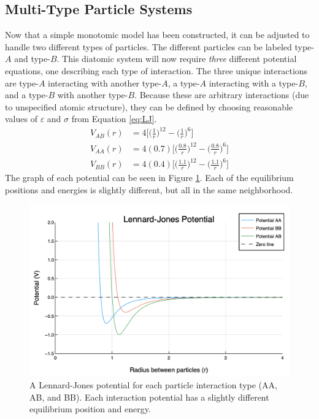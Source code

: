 \subsection{Multi-Type Particle Systems}\label{Sect:diatomic}
\par Now that a simple monotomic model has been constructed, it can be adjusted to handle two different types of particles. The different particles can be labeled type-$A$ and type-$B$. This diatomic system will now require \textit{three} different potential equations, one describing each type of interaction. The three unique interactions are type-$A$ interacting with another type-$A$, a type-$A$ interacting with a type-$B$, and a type-$B$ with another type-$B$. Because these are arbitrary interactions (due to unspecified atomic structure), they can be defined by choosing reasonable values of $\varepsilon$ and $\sigma$ from Equation \ref{eq:LJ}. 
\begin{align}
V_{AB}(r) &= 4 \bigg[\Big(\frac{1}{r}\Big)^{12} - \Big(\frac{1}{r}\Big)^6\bigg] \label{LJ} \\
V_{AA}(r) &= 4 (0.7) \bigg[\Big(\frac{0.8}{r}\Big)^{12} - \Big(\frac{0.8}{r}\Big)^6\bigg] \label{LJ} \\
V_{BB}(r) &= 4 (0.4) \bigg[\Big(\frac{1.1}{r}\Big)^{12} - \Big(\frac{1.1}{r}\Big)^6\bigg] \label{LJ}
\end{align}
The graph of each potential can be seen in Figure \ref{fig:3LJ}. Each of the equilibrium positions and energies is slightly different, but all in the same neighborhood.

\begin{figure}[h]
\includegraphics[scale = 0.4]{Figures/newLJPotential}
\caption{A Lennard-Jones potential for each particle interaction type (AA, AB, and BB). Each interaction potential has a slightly different equilibrium position and energy. 
\label{fig:3LJ}} 
\end{figure}


